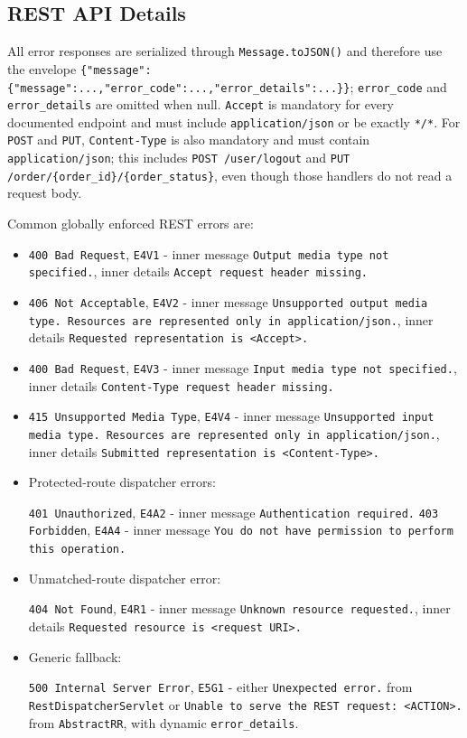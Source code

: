 \subsection{REST API Details}

All error responses are serialized through \texttt{Message.toJSON()} and therefore use the envelope \texttt{\{"message":\{"message":...,"error\_code":...,"error\_details":...\}\}}; \texttt{error\_code} and \texttt{error\_details} are omitted when null. \texttt{Accept} is mandatory for every documented endpoint and must include \texttt{application/json} or be exactly \texttt{*/*}. For \texttt{POST} and \texttt{PUT}, \texttt{Content-Type} is also mandatory and must contain \texttt{application/json}; this includes \texttt{POST /user/logout} and \texttt{PUT /order/\{order\_id\}/\{order\_status\}}, even though those handlers do not read a request body.

Common globally enforced REST errors are:

\begin{itemize}
\item \texttt{400 Bad Request}, \texttt{E4V1} - inner message \texttt{Output media type not specified.}, inner details \texttt{Accept request header missing.}
\item \texttt{406 Not Acceptable}, \texttt{E4V2} - inner message \texttt{Unsupported output media type. Resources are represented only in application/json.}, inner details \texttt{Requested representation is <Accept>.}
\item \texttt{400 Bad Request}, \texttt{E4V3} - inner message \texttt{Input media type not specified.}, inner details \texttt{Content-Type request header missing.}
\item \texttt{415 Unsupported Media Type}, \texttt{E4V4} - inner message \texttt{Unsupported input media type. Resources are represented only in application/json.}, inner details \texttt{Submitted representation is <Content-Type>.}
\item Protected-route dispatcher errors:

\texttt{401 Unauthorized}, \texttt{E4A2} - inner message \texttt{Authentication required.} \texttt{403 Forbidden}, \texttt{E4A4} - inner message \texttt{You do not have permission to perform this operation.}
\item Unmatched-route dispatcher error:

\texttt{404 Not Found}, \texttt{E4R1} - inner message \texttt{Unknown resource requested.}, inner details \texttt{Requested resource is <request URI>.}
\item Generic fallback:

\texttt{500 Internal Server Error}, \texttt{E5G1} - either \texttt{Unexpected error.} from \texttt{RestDispatcherServlet} or \texttt{Unable to serve the REST request: <ACTION>.} from \texttt{AbstractRR}, with dynamic \texttt{error\_details}.
\end{itemize}

